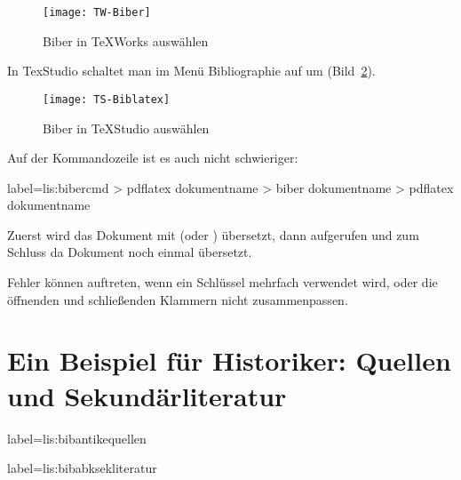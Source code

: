 \begin{figure}
  \texttt{[image: TW-Biber]}
  \caption{Biber in TeXWorks auswählen}
  \label{fig:lis:TWbiber}
\end{figure}

In TexStudio schaltet man im Menü Bibliographie auf \BibLaTeX{} um (Bild~\ref{fig:lis:TSbiblatex}).

\begin{figure}
  \texttt{[image: TS-Biblatex]}
  \caption{Biber in TeXStudio auswählen}
  \label{fig:lis:TSbiblatex}
\end{figure}

Auf der Kommandozeile ist es auch nicht schwieriger:

\begin{lfgwcode}{label={lis:bibercmd}}
> pdflatex dokumentname
> biber dokumentname
> pdflatex dokumentname
\end{lfgwcode}

Zuerst wird das Dokument mit  (oder ) übersetzt,
dann \biber{} aufgerufen und zum Schluss da Dokument noch einmal übersetzt.

Fehler können auftreten, wenn ein Schlüssel mehrfach verwendet wird, 
oder die öffnenden und schließenden Klammern nicht zusammenpassen.

\section{Ein Beispiel für Historiker: Quellen und Sekundärliteratur}\label{sec:bibliografie}




\begin{lfgwcode}{label={lis:bibantikequellen}}
\printbibliography[%
  heading=subbibliography,
  keyword=ancient,%
  title={Antike Quellen}]
\end{lfgwcode}

\begin{lfgwcode}{label={lis:bibabksekliteratur}}
\printbibliography[%
  heading=subbibliography,
  keyword=corpus,%
  title={Abkürzungen und Sigel}]

\printbibliography[%
  heading=subbibliography,
  notkeyword=ancient,%
  notkeyword=corpus,%
  title={Sekundärliteratur}]
\end{lfgwcode}

